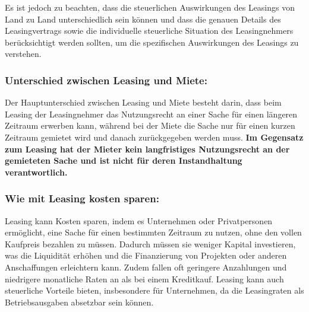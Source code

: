 \documentclass{article}
\begin{document}
Es ist jedoch zu beachten, dass die steuerlichen Auswirkungen des Leasings von
Land zu Land unterschiedlich sein können und dass die genauen Details des
Leasingvertrags sowie die individuelle steuerliche Situation des Leasingnehmers
berücksichtigt werden sollten, um die spezifischen Auswirkungen des Leasings zu
verstehen.

\subsubsection*{Unterschied zwischen Leasing und Miete:}
Der Hauptunterschied zwischen Leasing und Miete besteht darin, dass beim
Leasing der Leasingnehmer das Nutzungsrecht an einer Sache für einen längeren
Zeitraum erwerben kann, während bei der Miete die Sache nur für einen kurzen
Zeitraum gemietet wird und danach zurückgegeben werden muss. \textbf{Im Gegensatz zum
Leasing hat der Mieter kein langfristiges Nutzungsrecht an der gemieteten Sache
und ist nicht für deren Instandhaltung verantwortlich.}

\subsubsection*{Wie mit Leasing kosten sparen:}
Leasing kann Kosten sparen, indem es Unternehmen oder Privatpersonen
ermöglicht, eine Sache für einen bestimmten Zeitraum zu nutzen, ohne den vollen
Kaufpreis bezahlen zu müssen. Dadurch müssen sie weniger Kapital investieren,
was die Liquidität erhöhen und die Finanzierung von Projekten oder anderen
Anschaffungen erleichtern kann. Zudem fallen oft geringere Anzahlungen und
niedrigere monatliche Raten an als bei einem Kreditkauf. Leasing kann auch
steuerliche Vorteile bieten, insbesondere für Unternehmen, da die Leasingraten
als Betriebsausgaben absetzbar sein können.
\end{document}
